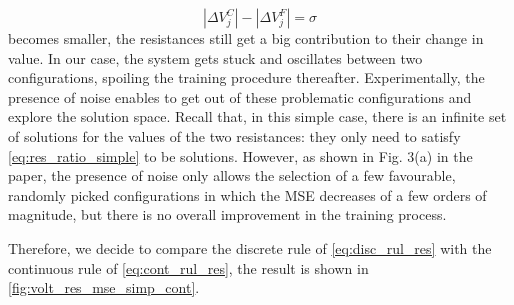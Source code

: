 \documentclass[10.5pt]{article}
\begin{document}
\[
|\Delta V^{C}_{j}|-|\Delta V^{F}_{j}| = \sigma
\]
becomes smaller, the resistances still get a big contribution to their change in value. In our case, the system gets stuck and oscillates between two configurations, spoiling the training procedure thereafter. Experimentally, the presence of noise enables to get out of these problematic configurations and explore the solution space. Recall that, in this simple case, there is an infinite set of solutions for the values of the two resistances: they only need to satisfy \cref{eq:res_ratio_simple} to be solutions. However, as shown in Fig. 3(a) in the paper, the presence of noise only allows the selection of a few favourable, randomly picked configurations in which the MSE decreases of a few orders of magnitude, but there is no overall improvement in the training process.

Therefore, we decide to compare the discrete rule of \cref{eq:disc_rul_res} with the continuous rule of \cref{eq:cont_rul_res}, the result is shown in \cref{fig:volt_res_mse_simp_cont}. 
\end{document}
